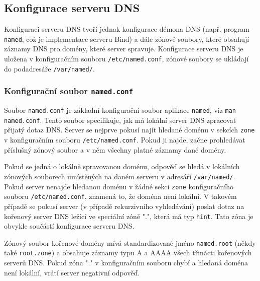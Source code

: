 \subsection{Konfigurace serveru DNS}
Konfiguraci serveru DNS tvoří jednak konfigurace démona DNS (např. program {\tt named}, což je implementace serveru Bind) a dále zónové soubory, které obsahují záznamy DNS pro domény, které server spravuje. Konfigurace serveru DNS je uložena v konfiguračním souboru {\tt /etc/named.conf}, zónové soubory se ukládají do podadresáře {\tt /var/named/}. 

\subsubsection{Konfigurační soubor {\tt named.conf}}
Soubor {\tt named.conf} je základní konfigurační soubor aplikace {\tt named}, viz {\tt man named.conf}. Tento soubor specifikuje, jak má lokální server DNS zpracovat přijatý dotaz DNS. Server se nejprve pokusí najít hledané doménu v sekcích {\tt zone} v konfiguračním souboru {\tt /etc/named.conf}. Pokud ji najde, začne prohledávat příslušný zónový soubor a v něm všechny platné záznamy dané domény. 

Pokud se jedná o lokálně spravovanou doménu, odpověď se hledá v lokálních zónových souborech umístěných na daném serveru v adresáři {\tt /var/named/}. Pokud server nenajde hledanou doménu v žádné sekci {\tt zone} konfiguračního souboru {\tt /etc/named.conf}, znamená to, že doména není lokální. V takovém případě se pokusí server (v případě rekurzivního vyhledávání) poslat dotaz  na kořenový server DNS ležící ve speciální zóně ".", která má typ {\tt hint}. Tato zóna je obvykle součástí konfigurace serveru DNS.

Zónový soubor kořenové domény mívá standardizované jméno {\tt named.root} (někdy také {\tt root.zone}) a obsahuje záznamy typu A a AAAA všech třinácti kořenových serverů DNS. Pokud zóna "." v konfiguračním souboru chybí a hledaná doména není lokální, vrátí server negativní odpověď.

